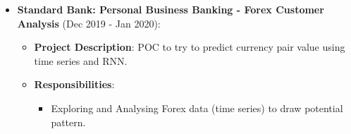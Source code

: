 \documentclass[letterpaper]{moderncv}        %
\begin{document}
{\begin{itemize}
		\begin{itemize}
		\item \textbf{Project Description}: Enhance incident reporting in the banks systems using NLP and GraphDB as opposed to relational DB. It reduced human interaction and faster ticket assignment.
		\item \textbf{Responsibilities}:
		\begin{itemize}
			\item Making incident reports in the back escalating quicker using NLP,
			\item Assisted in building GraphDB representation of the hierarchy in the bank,
		\end{itemize}
		\end{itemize}		
		\item \textbf{Standard Bank: Personal Business Banking - Forex Customer Analysis} (Dec 2019 - Jan 2020): 
		\begin{itemize}
		\item \textbf{Project Description}: POC to try to predict currency pair value using time series and RNN.
		\item \textbf{Responsibilities}:
		\begin{itemize}
			\item Exploring and Analysing Forex data (time series) to draw potential pattern.
		\end{itemize}
	\end{itemize}
\end{itemize}}
\end{document}
